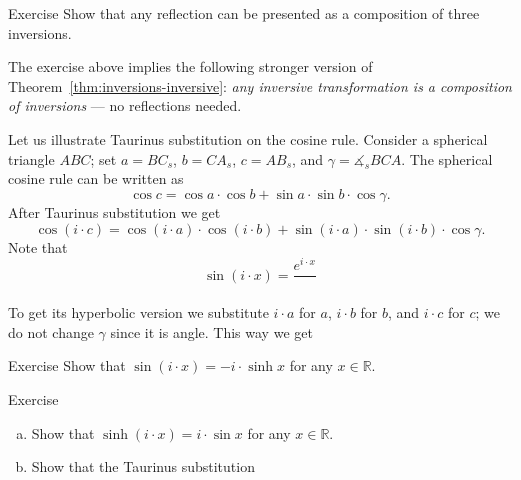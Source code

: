 \begin{thm}{Exercise}\label{ex:reflection/inversive}
Show that any reflection can be presented as a composition of three inversions. 
\end{thm}

The exercise above implies the following stronger version of Theorem~\ref{thm:inversions-inversive}:
\textit{any inversive transformation is a composition of inversions} ---
no reflections needed.



















Let us illustrate Taurinus substitution on the cosine rule.
Consider a spherical triangle $ABC$; set
$a=BC_s$, $b=CA_s$, $c=AB_s$, and $\gamma=\measuredangle_sBCA$.
The spherical cosine rule can be written as 
\[\cos c=\cos a \cdot \cos b+\sin a\cdot \sin b\cdot \cos\gamma.\]
After Taurinus substitution we get 
\[\cos (i\cdot c)=\cos (i\cdot a) \cdot \cos (i\cdot b)+\sin (i\cdot a)\cdot \sin (i\cdot b)\cdot \cos\gamma.\]
Note that 
\[\sin (i\cdot x)=\frac{e^{i\cdot x}}{}\]

To get its hyperbolic version we substitute $i\cdot a$ for $a$, $i\cdot b$ for $b$, and $i\cdot c$ for $c$; we do not change $\gamma$ since it is angle.
This way we get 


\begin{thm}{Exercise}
Show that $\sin (i\cdot x)=-i\cdot \sinh x$ for any $x\in\mathbb{R}$.
\end{thm}


\begin{thm}{Exercise}
\begin{enumerate}[(a)]
\item Show that $\sinh (i\cdot x)=i\cdot \sin x$ for any $x\in\mathbb{R}$.
\item Show that the Taurinus substitution
\end{enumerate}


\end{thm}

